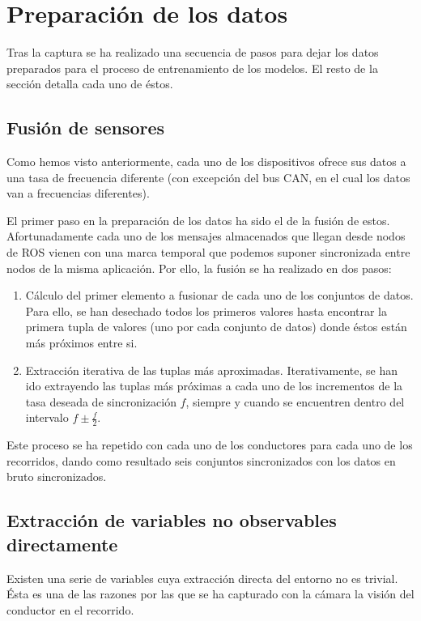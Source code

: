 \section{Preparación de los datos}

Tras la captura se ha realizado una secuencia de pasos para dejar los datos preparados para el proceso de entrenamiento de los modelos. El resto de la sección detalla cada uno de éstos.

\subsection{Fusión de sensores}

Como hemos visto anteriormente, cada uno de los dispositivos ofrece sus datos a una tasa de frecuencia diferente (con excepción del bus CAN, en el cual los datos van a frecuencias diferentes).

El primer paso en la preparación de los datos ha sido el de la fusión de estos. Afortunadamente cada uno de los mensajes almacenados que llegan desde nodos de ROS vienen con una marca temporal que podemos suponer sincronizada entre nodos de la misma aplicación. Por ello, la fusión se ha realizado en dos pasos:

\begin{enumerate}
	\item Cálculo del primer elemento a fusionar de cada uno de los conjuntos de datos. Para ello, se han desechado todos los primeros valores hasta encontrar la primera tupla de valores (uno por cada conjunto de datos) donde éstos están más próximos entre si.
	\item Extracción iterativa de las tuplas más aproximadas. Iterativamente, se han ido extrayendo las tuplas más próximas a cada uno de los incrementos de la tasa deseada de sincronización $f$, siempre y cuando se encuentren dentro del intervalo $f \pm \frac{f}{2}$.
\end{enumerate}

Este proceso se ha repetido con cada uno de los conductores para cada uno de los recorridos, dando como resultado seis conjuntos sincronizados con los datos en bruto sincronizados.

\subsection{Extracción de variables no observables directamente}

Existen una serie de variables cuya extracción directa del entorno no es trivial. Ésta es una de las razones por las que se ha capturado con la cámara la visión del conductor en el recorrido.


